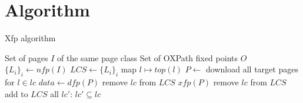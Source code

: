 \documentclass[]{article}
\title{}
\author{}
\begin{document}
\maketitle

\begin{abstract}

\end{abstract}

\section{Algorithm}

\begin{algorithm}
	\caption{Xfp algorithm}\label{xfp}
	\begin{algorithmic}[1]
		\Require Set of pages $I$ of the same page class
		\Ensure Set of OXPath fixed points $O$
		\State $\{L_i\}_i \gets nfp(I)$
		\State $LCS \gets \{L_i\}_i$ map $l \mapsto top(l)$
			\State $P \gets $ download all target pages for $l \in lc$
			\State $data \gets dfp(P)$
				\State remove $lc$ from $LCS$
				\State $xfp(P)$ 
			\Else 
				\State remove $lc$ from $LCS$
				\State add to $LCS$ all $lc'$: $lc' \subseteq lc$ 
			\EndIf
		\EndWhile
		\EndProcedure
	\end{algorithmic}
\end{algorithm}
\end{document}
